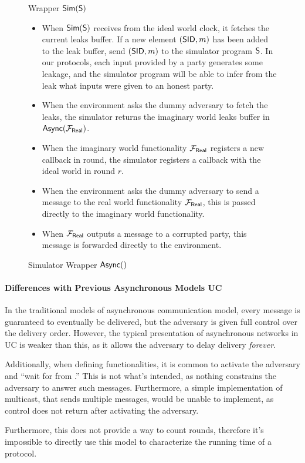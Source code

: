 \begin{figure}[h]
\begin{boxedminipage}{\columnwidth}
\begin{centering}
Wrapper ${\mathsf {Sim}}({\mathsf {S}})$ \\
\end{centering}
\begin{itemize}
\item When ${\mathsf {Sim}}({\mathsf {S}})$ receives  from the ideal world clock, it fetches the current leaks buffer. If a new element $({\mathsf {SID}},m)$ has been added to the leak buffer, send $({\mathsf {SID}},m)$ to the simulator program ${\mathsf {S}}$. In our protocols, each input provided by a party generates some leakage, and the simulator program will be able to infer from the leak what inputs were given to an honest party.
\item When the environment asks the dummy adversary to fetch the leaks, the simulator returns the imaginary world leaks buffer in $\msf{Async}(\F{Real})$.
\item When the imaginary world functionality $\F{Real}$ registers a new callback in round, the simulator registers a callback with the ideal world in round $r$.
\item When the environment asks the dummy adversary to send a message to the real world functionality $\F{Real}$, this is passed directly to the imaginary world functionality.
\item When $\F{Real}$ outputs a message to a corrupted party, this message is forwarded directly to the environment.
\end{itemize}
\end{boxedminipage}
\caption{Simulator Wrapper ${\mathsf {Async}}()$}
\end{figure}



\paragraph{Differences with Previous Asynchronous Models UC}
In the traditional models of asynchronous communication model, every message is guaranteed to eventually be delivered, but the adversary is given full control over the delivery order.
However, the typical presentation of asynchronous networks in UC is weaker than this, as it allows the adversary to delay delivery \emph{forever}.

Additionally, when defining functionalities, it is common to activate the adversary and ``wait for  from \A.'' This is not what's intended, as nothing constrains the adversary to answer such messages. Furthermore, a simple implementation of multicast, that sends multiple messages, would be unable to implement, as control does not return after activating the adversary. 

Furthermore, this does not provide a way to count rounds, therefore it's impossible to directly use this model to characterize the running time of a protocol.


